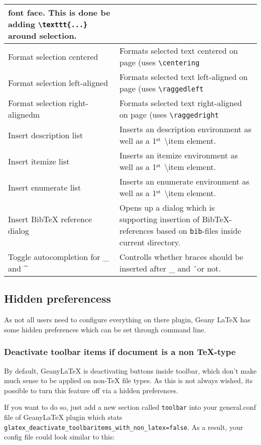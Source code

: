 \documentclass[%
paper=a4,%
fontsize=11pt,%
twoside=false,%
DIV18,%
headsepline,%
plainheadsepline,%
footsepline,%
plainfootsepline,%
bibliography=totoc,%
listof=totoc,%
BCOR10mm,%
parskip=half,%
openany,%
]{scrartcl}
\newcommand{\up}[1]{\ensuremath{^\textrm{\scriptsize#1}}}
\begin{document}
\begin{table}[H]
\begin{tabular}{l|p{9cm}}
font face. This is done be adding \texttt{\textbackslash texttt\{...\}} around
selection.\\\hline
Format selection centered & Formats selected text centered on page (uses \texttt{\textbackslash{}centering} \\\hline
Format selection left-aligned & Formats selected text left-aligned on page (uses \texttt{\textbackslash{}raggedleft} \\\hline
Format selection right-alignedm & Formats selected text right-aligned on page (uses \texttt{\textbackslash{}raggedright}\\\hline
Insert description list & Inserts an description environment as well as a 1\up{st} \textbackslash{}item element.\\\hline
Insert itemize list & Inserts an itemize environment as well as a 1\up{st} \textbackslash{}item element.\\\hline
Insert enumerate list & Inserts an enumerate environment as well as a 1\up{st} \textbackslash{}item element.\\\hline
Insert BibTeX reference dialog & Opens up a dialog which is supporting insertion of BibTeX-references based on \texttt{bib}-files inside current directory.\\\hline
Toggle autocompletion for \_ and \^ & Controlls whether braces should be inserted after \_ and \^ \ or not.
\end{tabular}
\end{table}


\subsection{Hidden preferencess}
\label{sec:hidden_preferences}
As not all users need to configure everything on there plugin, Geany
\LaTeX{} has some hidden preferences which can be set through
command line.

\subsubsection{Deactivate toolbar items if document is a non \TeX-type}
\label{deactivate_toolbaritems_with_non_latex}
By default, Geany\LaTeX{} is deactivating buttons inside toolbar, which
don't make much sense to be applied on non-\TeX{} file types. As
this is not always wished, its possible to turn this feature off
via a hidden preferences.

If you want to do so, just add a new section called \texttt{toolbar}
into your general.conf file of Geany\LaTeX{} plugin which stats
\texttt{glatex\_deactivate\_toolbaritems\_with\_non\_latex=false}.
As a result, your config file could look similar to this:
\end{document}
